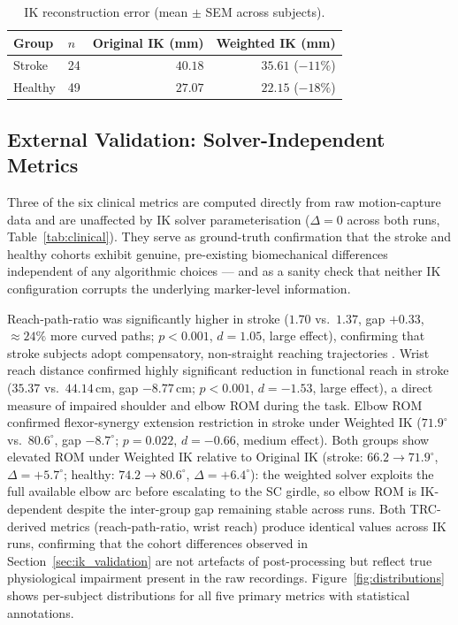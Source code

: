 \documentclass[journal,10pt,twocolumn]{IEEEtran}
\begin{document}
\begin{table}[h]
  \centering
  \caption{IK reconstruction error (mean $\pm$ SEM across subjects).}
  \label{tab:error}
  \setlength{\tabcolsep}{4pt}
  \begin{tabular}{llrr}
    \toprule
    \textbf{Group} & \textbf{$n$}
      & \textbf{Original IK (mm)}
      & \textbf{Weighted IK (mm)} \\
    \midrule
    Stroke  & 24 & $40.18$ & $35.61$ ($-11\%$) \\
    Healthy & 49 & $27.07$ & $22.15$ ($-18\%$) \\
    \bottomrule
  \end{tabular}
\end{table}

\subsection{External Validation: Solver-Independent Metrics}

Three of the six clinical metrics are computed directly from raw
motion-capture data and are unaffected by IK solver parameterisation
($\Delta{=}0$ across both runs, Table~\ref{tab:clinical}).
They serve as ground-truth confirmation that the stroke and healthy cohorts
exhibit genuine, pre-existing biomechanical differences independent of any
algorithmic choices --- and as a sanity check that neither IK configuration
corrupts the underlying marker-level information.

Reach-path-ratio was significantly higher in stroke ($1.70$ vs.\ $1.37$,
gap $+0.33$, ${\approx}24\%$ more curved paths; $p{<}0.001$,
$d{=}1.05$, large effect), confirming that stroke subjects adopt
compensatory, non-straight reaching trajectories \cite{cirstea2000}.
Wrist reach distance confirmed highly significant reduction in functional reach
in stroke ($35.37$ vs.\ $44.14$\,cm, gap $-8.77$\,cm; $p{<}0.001$,
$d{=}-1.53$, large effect), a direct measure of impaired shoulder and elbow
ROM during the task.
Elbow ROM confirmed flexor-synergy extension restriction in stroke under
Weighted IK ($71.9^{\circ}$ vs.\ $80.6^{\circ}$, gap $-8.7^{\circ}$;
$p{=}0.022$, $d{=}-0.66$, medium effect). Both groups show elevated ROM
under Weighted IK relative to Original IK (stroke: $66.2{\to}71.9^{\circ}$,
$\Delta{=}{+5.7^{\circ}}$; healthy: $74.2{\to}80.6^{\circ}$, $\Delta{=}{+6.4^{\circ}}$):
the weighted solver exploits the full available elbow arc before escalating
to the SC girdle, so elbow ROM is IK-dependent despite the inter-group gap
remaining stable across runs.
Both TRC-derived metrics (reach-path-ratio, wrist reach) produce identical
values across IK runs, confirming
that the cohort differences observed in Section~\ref{sec:ik_validation}
are not artefacts of post-processing but reflect true physiological
impairment present in the raw recordings.
Figure~\ref{fig:distributions} shows per-subject distributions for all
five primary metrics with statistical annotations.
\end{document}
